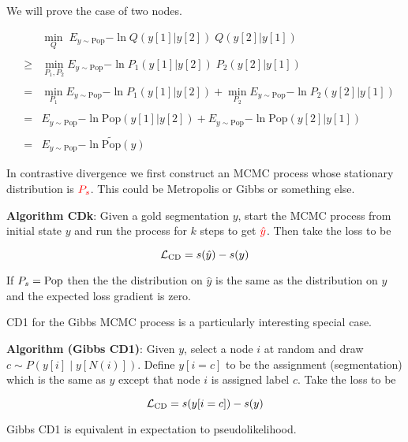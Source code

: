{We will prove the case of two nodes.

\vfill
\begin{eqnarray*}
  & & \min_Q \;E_{y\sim \mathrm{Pop}}{-\ln Q(y[1]|y[2])\;Q(y[2]|y[1])} \\
  \\
  & \geq & \min_{P_1,P_2} E_{y \sim \mathrm{Pop}}{-\ln P_1(y[1]|y[2])\;P_2(y[2]|y[1])} \\
  \\
  & = & \min_{P_1} E_{y \sim \mathrm{Pop}}{-\ln P_1(y[1]|y[2])} + \min_{P_2} E_{y \sim \mathrm{Pop}}{-\ln P_2(y[2]|y[1])} \\
  \\
  & = & E_{y \sim \mathrm{Pop}}{-\ln \mathrm{Pop}(y[1]|y[2])} + E_{y \sim \mathrm{Pop}}{-\ln \mathrm{Pop}(y[2]|y[1])} \\
  \\
  & = & E_{y \sim \mathrm{Pop}}{-\ln \widetilde{\mathrm{Pop}}(y)}
\end{eqnarray*}


In contrastive divergence we first construct an MCMC process whose stationary distribution is ${\color{red} P_s}$.  This could be
Metropolis or Gibbs or something else.

\vfill
{\bf Algorithm CDk}: Given a gold segmentation $y$, start the MCMC process from initial state $y$ and run the process for $k$ steps
to get ${\color{red} \hat{y}}$.  Then take the loss to be

\vfill
{\color{red} $${\cal L}_{\mathrm{CD}}  = s(\hat{y}) - s(y)$$}

If $P_s = \mathrm{Pop}$ then the the distribution on $\hat{y}$ is the same as the distribution on $y$ and the
expected loss gradient is zero.


CD1 for the Gibbs MCMC process is a particularly interesting special case.

\vfill
{\bf Algorithm (Gibbs CD1)}: Given $y$, select a node $i$ at random and draw {\color{red} $c \sim P(y[i]\;| \;y[N(i)])$}. Define {\color{red} $y[i=c]$}
to be the assignment (segmentation) which is the same as $y$ except that node $i$ is assigned label $c$.  Take the loss to be

\vfill
{\color{red} $${\cal L}_{\mathrm{CD}}  = s(y[i=c]) - s(y)$$}


Gibbs CD1 is equivalent in expectation to pseudolikelihood.

}
